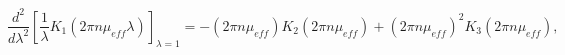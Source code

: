 \begin{equation}
\frac{d^{2}}{d\lambda ^{2}}\left[\frac{1}{\lambda }K_{1}\left(2\pi n\mu _{eff}\lambda \right)\right]_{\lambda =1}=-\left(2\pi n\mu _{eff}\right)K_{2}\left(2\pi n\mu _{eff}\right)+\left(2\pi n\mu _{eff}\right)^{2}K_{3}\left(2\pi n\mu _{eff}\right),\end{equation}

